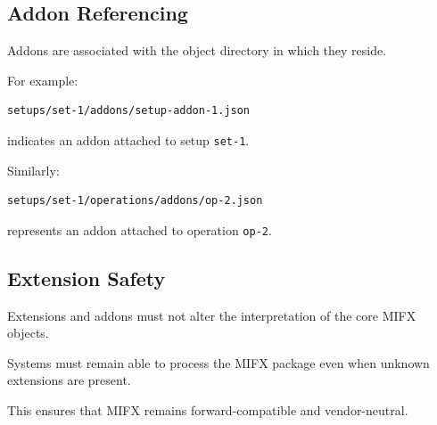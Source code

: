 \subsection{Addon Referencing}

Addons are associated with the object directory in which they reside.

For example:

\begin{verbatim}
setups/set-1/addons/setup-addon-1.json
\end{verbatim}

indicates an addon attached to setup \texttt{set-1}.

Similarly:

\begin{verbatim}
setups/set-1/operations/addons/op-2.json
\end{verbatim}

represents an addon attached to operation \texttt{op-2}.

\subsection{Extension Safety}

Extensions and addons must not alter the interpretation of the core MIFX objects.

Systems must remain able to process the MIFX package even when unknown extensions are present.

This ensures that MIFX remains forward-compatible and vendor-neutral.
